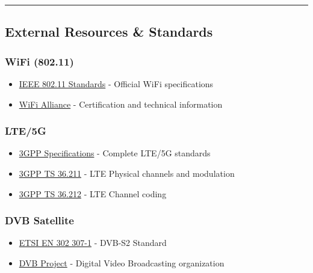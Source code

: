 \begin{center}\rule{0.5\linewidth}{0.5pt}\end{center}

\subsection{External Resources \&
Standards}\label{external-resources-standards}

\subsubsection{WiFi (802.11)}\label{wifi-802.11}

\begin{itemize}
\tightlist
\item
  \href{https://standards.ieee.org/standard/802_11-2020.html}{IEEE
  802.11 Standards} - Official WiFi specifications
\item
  \href{https://www.wi-fi.org/}{WiFi Alliance} - Certification and
  technical information
\end{itemize}

\subsubsection{LTE/5G}\label{lte5g}

\begin{itemize}
\tightlist
\item
  \href{https://www.3gpp.org/ftp/Specs/archive/}{3GPP Specifications} -
  Complete LTE/5G standards
\item
  \href{https://www.3gpp.org/ftp/Specs/archive/36_series/36.211/}{3GPP
  TS 36.211} - LTE Physical channels and modulation
\item
  \href{https://www.3gpp.org/ftp/Specs/archive/36_series/36.212/}{3GPP
  TS 36.212} - LTE Channel coding
\end{itemize}

\subsubsection{DVB Satellite}\label{dvb-satellite}

\begin{itemize}
\tightlist
\item
  \href{https://www.etsi.org/deliver/etsi_en/302300_302399/30230701/}{ETSI
  EN 302 307-1} - DVB-S2 Standard
\item
  \href{https://www.dvb.org/}{DVB Project} - Digital Video Broadcasting
  organization
\end{itemize}

